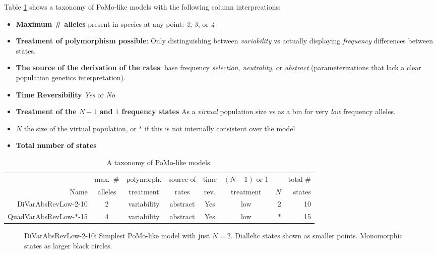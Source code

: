 \documentclass{llncs}
\newcommand{\virtPopSize}{\ensuremath{N}}
\newcommand{\pomo}{PoMo\xspace}
\begin{document}
Table \ref{taxonomy} shows a taxonomy of \pomo-like models with the following column interpreations:
\begin{itemize}
    \item \textbf{Maximum \# alleles} present in species at any point: {\em 2}, {\em 3}, or {\em 4}
    \item \textbf{Treatment of polymorphism possible}: Only distinguishing between {\em variability} vs
    actually displaying {\em frequency} differences between states.
    \item \textbf{The source of the derivation of the rates}: base frequency {\em selection}, {\em neutrality}, or {\em abstract} (parameterizations that lack a clear population genetics interpretation).
    \item \textbf{Time Reversibility} {\em Yes} or {\em No}
    \item \textbf{Treatment of the $\virtPopSize -1$ and $1$ frequency states} As a {\em virtual} population size vs as a bin for very {\em low} frequency alleles.
    \item \textbf{$\virtPopSize$} the size of the virtual population, or $\ast$ if this is not internally consistent over the model
    \item \textbf{Total number of states}
\end{itemize}
\begin{table}
    \caption{A taxonomy of \pomo-like models.}\label{taxonomy}
        \begin{tabular}{r|c|c|c|c|c|r|r}
                           & max.~\# & polymorph.& source of & time & $(\virtPopSize -1)$ or 1  & & total \#\\
        Name               & alleles & treatment & rates     & rev. & treatment                 & $\virtPopSize $& states\\
        \hline
        DiVarAbsRevLow-2-10   & 2 & variability &abstract & Yes   & low & 2 & 10\\
        \hline
        QuadVarAbsRevLow-$\ast$-15 & 4 & variability &abstract & Yes   & low & $\ast$ & 15\\
        \hline
        \end{tabular}
    \begin{center}
    \end{center}
\end{table}

\begin{figure}
    \begin{center}
        \caption{DiVarAbsRevLow-2-10: Simplest \pomo-like model with just $\virtPopSize=2$. Diallelic states shown as smaller points. Monomorphic states as larger black circles.}\label{pomoDiVarAbsRevLow}
    \end{center}
\end{figure}
\end{document}
